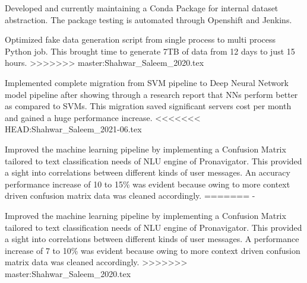 \documentclass[]{deedy-resume-openfont}
\begin{document}
\begin{minipage}[t]{0.63\textwidth}
\begin{tightemize}
\item Developed and currently maintaining a Conda Package for internal dataset abstraction. The package testing is automated through Openshift and Jenkins.

\item Optimized fake data generation script from single process to multi process Python job. This brought time to generate 7TB of data from 12 days to just 15 hours.
>>>>>>> master:Shahwar_Saleem_2020.tex

\end{tightemize}
\sectionsep

\vspace{\topsep} %
\begin{tightemize}

\item Implemented complete migration from SVM pipeline to Deep Neural Network model pipeline after showing through a research report that NNs perform better as compared to SVMs.  This migration saved significant servers cost per month and gained a huge performance increase. 
<<<<<<< HEAD:Shahwar_Saleem_2021-06.tex

\item Improved the machine learning pipeline by implementing a Confusion Matrix tailored to text classification needs of NLU engine of Pronavigator. This provided a sight into correlations between different kinds of user messages. An accuracy performance increase of 10 to 15\% was evident because owing to more context driven confusion matrix data was cleaned accordingly.
=======
-
\item Improved the machine learning pipeline by implementing a Confusion Matrix tailored to text classification needs of NLU engine of Pronavigator. This provided a sight into correlations between different kinds of user messages. A performance increase of 7 to 10\% was evident because owing to more context driven confusion matrix data was cleaned accordingly.
>>>>>>> master:Shahwar_Saleem_2020.tex

\end{tightemize}
\sectionsep



\end{minipage}
\end{document}
